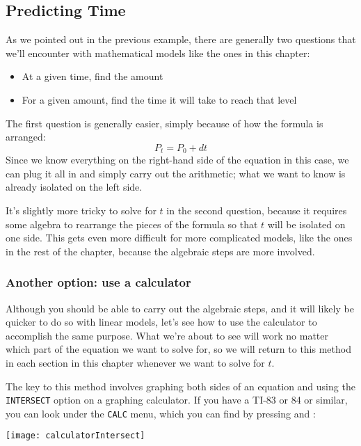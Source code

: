 \subsection{Predicting Time}
As we pointed out in the previous example, there are generally two questions that we'll encounter with mathematical models like the ones in this chapter:
\begin{itemize}
\item At a given time, find the amount
\item For a given amount, find the time it will take to reach that level
\end{itemize}

The first question is generally easier, simply because of how the formula is arranged:
\[P_t = P_0 + dt\]
Since we know everything on the right-hand side of the equation in this case, we can plug it all in and simply carry out the arithmetic; what we want to know is already isolated on the left side.

It's slightly more tricky to solve for $t$ in the second question, because it requires some algebra to rearrange the pieces of the formula so that $t$ will be isolated on one side.  This gets even more difficult for more complicated models, like the ones in the rest of the chapter, because the algebraic steps are more involved.

\subsubsection*{Another option: use a calculator}
Although you should be able to carry out the algebraic steps, and it will likely be quicker to do so with linear models, let's see how to use the calculator to accomplish the same purpose.  What we're about to see will work no matter which part of the equation we want to solve for, so we will return to this method in each section in this chapter whenever we want to solve for $t$.
\vfill
\pagebreak

The key to this method involves graphing both sides of an equation and using the \texttt{INTERSECT} option on a graphing calculator.  If you have a TI-83 or 84 or similar, you can look under the \texttt{CALC} menu, which you can find by pressing  and :
\begin{center}
\texttt{[image: calculatorIntersect]}
\end{center}

